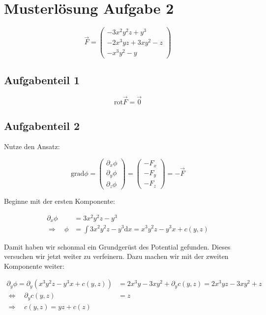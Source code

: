 \section{Musterlösung Aufgabe 2}
\begin{equation*}
\vec{F}=\begin{pmatrix} -3x^2y^2z+y^3 \\ -2x^3yz+3xy^2-z \\ -x^3y^2-y\end{pmatrix}
\end{equation*}

\subsection{Aufgabenteil 1}

\begin{equation*}
\mathrm{rot}\vec{F}=\vec{0}
\end{equation*}

\subsection{Aufgabenteil 2}

Nutze den Ansatz:

\begin{equation*}
\mathrm{grad}\phi=\begin{pmatrix} \partial_x \phi \\ \partial_y \phi \\ \partial_z \phi \end{pmatrix} =\begin{pmatrix} -F_x \\ -F_y \\ -F_z \end{pmatrix}=-\vec{F}
\end{equation*}

Beginne mit der ersten Komponente:

\begin{align*}
\partial_x \phi&=3x^2y^2z-y^3 \\
\Rightarrow \quad  \phi&=\int 3x^2y^2z-y^3 \mathrm{d}x = x^3y^2z-y^3x+c(y,z)
\end{align*}

Damit haben wir schonmal ein Grundgerüst des Potential gefunden.
Dieses versuchen wir jetzt weiter zu verfeinern.
Dazu machen wir mit der zweiten Komponente weiter:

\begin{align*}
\partial_y \phi= \partial_y\left( x^3y^2z-y^3x+c(y,z)\right)&=2x^3y-3xy^2+\partial_y c(y,z)= 2x^3yz-3xy^2+z \\
\Leftrightarrow \quad \partial_y c(y,z)&=z\\
\Rightarrow \quad c(y,z)=yz+c(z)
\end{align*}

